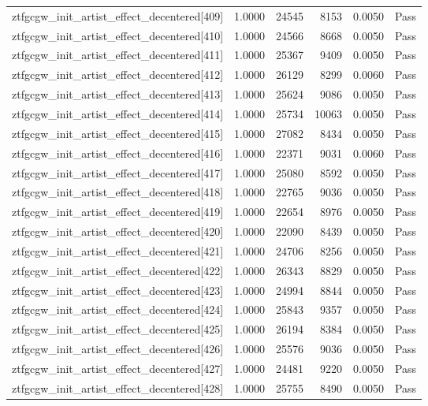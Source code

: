 \begin{table}[htbp]
\begin{tabular}{llrrll}
ztfgcgw\_init\_artist\_effect\_decentered[409] & 1.0000 & 24545 & 8153 & 0.0050 & Pass \\
ztfgcgw\_init\_artist\_effect\_decentered[410] & 1.0000 & 24566 & 8668 & 0.0050 & Pass \\
ztfgcgw\_init\_artist\_effect\_decentered[411] & 1.0000 & 25367 & 9409 & 0.0050 & Pass \\
ztfgcgw\_init\_artist\_effect\_decentered[412] & 1.0000 & 26129 & 8299 & 0.0060 & Pass \\
ztfgcgw\_init\_artist\_effect\_decentered[413] & 1.0000 & 25624 & 9086 & 0.0050 & Pass \\
ztfgcgw\_init\_artist\_effect\_decentered[414] & 1.0000 & 25734 & 10063 & 0.0050 & Pass \\
ztfgcgw\_init\_artist\_effect\_decentered[415] & 1.0000 & 27082 & 8434 & 0.0050 & Pass \\
ztfgcgw\_init\_artist\_effect\_decentered[416] & 1.0000 & 22371 & 9031 & 0.0060 & Pass \\
ztfgcgw\_init\_artist\_effect\_decentered[417] & 1.0000 & 25080 & 8592 & 0.0050 & Pass \\
ztfgcgw\_init\_artist\_effect\_decentered[418] & 1.0000 & 22765 & 9036 & 0.0050 & Pass \\
ztfgcgw\_init\_artist\_effect\_decentered[419] & 1.0000 & 22654 & 8976 & 0.0050 & Pass \\
ztfgcgw\_init\_artist\_effect\_decentered[420] & 1.0000 & 22090 & 8439 & 0.0050 & Pass \\
ztfgcgw\_init\_artist\_effect\_decentered[421] & 1.0000 & 24706 & 8256 & 0.0050 & Pass \\
ztfgcgw\_init\_artist\_effect\_decentered[422] & 1.0000 & 26343 & 8829 & 0.0050 & Pass \\
ztfgcgw\_init\_artist\_effect\_decentered[423] & 1.0000 & 24994 & 8844 & 0.0050 & Pass \\
ztfgcgw\_init\_artist\_effect\_decentered[424] & 1.0000 & 25843 & 9357 & 0.0050 & Pass \\
ztfgcgw\_init\_artist\_effect\_decentered[425] & 1.0000 & 26194 & 8384 & 0.0050 & Pass \\
ztfgcgw\_init\_artist\_effect\_decentered[426] & 1.0000 & 25576 & 9036 & 0.0050 & Pass \\
ztfgcgw\_init\_artist\_effect\_decentered[427] & 1.0000 & 24481 & 9220 & 0.0050 & Pass \\
ztfgcgw\_init\_artist\_effect\_decentered[428] & 1.0000 & 25755 & 8490 & 0.0050 & Pass \\

\end{tabular}
\end{table}
